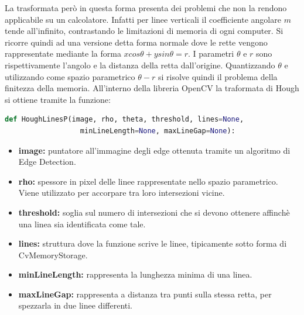 \documentclass[twoside]{supsistudent}
\begin{document}
La trasformata però in questa forma presenta dei problemi che non la rendono applicabile 
su un calcolatore. Infatti per linee verticali il coefficiente angolare $m$ tende all'infinito, 
contrastando le limitazioni di memoria di ogni computer. Si ricorre quindi ad una versione 
detta forma normale dove le rette vengono rappresentate mediante la forma $xcos\theta+ysin\theta=r$.
I parametri $\theta$ e $r$ sono rispettivamente l'angolo e la distanza della retta dall'origine. 
Quantizzando $\theta$ e utilizzando come spazio parametrico $\theta-r$ si risolve quindi il problema 
della finitezza della memoria.
All'interno della libreria OpenCV la traformata di Hough si ottiene tramite la funzione:
\begin{lstlisting}[language=Python]
  def HoughLinesP(image, rho, theta, threshold, lines=None, 
                  minLineLength=None, maxLineGap=None):
\end{lstlisting}
\begin{itemize}
  \item \textbf{image:} puntatore all'immagine degli edge ottenuta tramite un algoritmo di 
  Edge Detection.
  \item \textbf{rho:} spessore in pixel delle linee rappresentate nello spazio parametrico. 
  Viene utilizzato per accorpare tra loro intersezioni vicine.
  \item \textbf{threshold:} soglia sul numero di intersezioni che si devono ottenere 
  affinchè una linea sia identificata come tale.
  \item \textbf{lines:} struttura dove la funzione scrive le linee, tipicamente sotto forma 
  di CvMemoryStorage.
  \item \textbf{minLineLength:} rappresenta la lunghezza minima di una linea.
  \item \textbf{maxLineGap:} rappresenta a distanza tra punti sulla stessa retta, per 
  spezzarla in due linee differenti.
\end{itemize}
\end{document}
